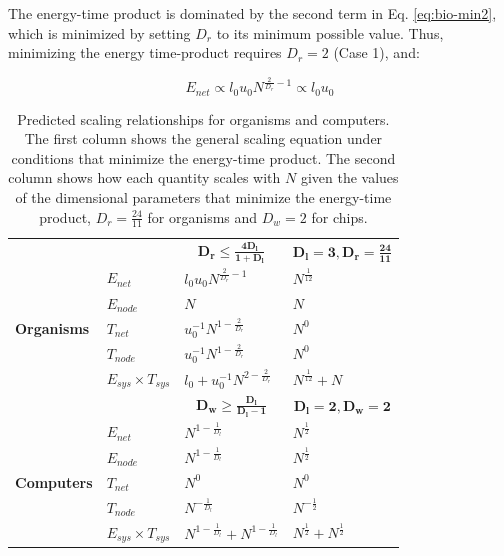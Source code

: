 \documentclass[12pt]{article}
\newcommand\T{\rule{0pt}{3ex}}       %
\newcommand\B{\rule[-1.2ex]{0pt}{0pt}} %
\begin{document}
The energy-time product is dominated by the second term in Eq.
\ref{eq:bio-min2}, which is minimized by setting $D_r$ to its minimum possible
value. Thus, minimizing the energy time-product requires $D_r = 2$
(Case 1), and:

\begin{equation}
E_{net} \propto l_0 u_0 N^{\frac{2}{D_r}-1} \propto l_0 u_0
\label{eq:EnetOrg}
\end{equation}


\begin{table}
\centering
\begin{tabular}{l|l||l|l|}
\multicolumn{2}{l}{} & \multicolumn{1}{c}{$\mathbf{D_r \leq
\frac{4D_l}{1+D_l}}$} & \multicolumn{1}{c}{$\mathbf{D_l=3, D_r=\frac{24}{11}}$}
  \T \B \\
  \cline{2-4}
\multirow{5}{*}{\textbf{Organisms}} & $E_{net}$ &$l_0u_0 N^{\frac{2}{D_r}-1}$ &
  $N^{\frac{1}{12}}$ \T \\
\cline{2-4}
& $E_{node}$ &  $N$ & $N$ \T \\
\cline{2-4}
& $T_{net}$ & $u_0^{-1}N^{1-\frac{2}{D_r}}$ & $N^0$ \T \\
\cline{2-4}
& $T_{node}$ & $u_0^{-1}N^{1-\frac{2}{D_r}}$ & $N^0$ \T \\  

\cline{2-4}
& $E_{sys} \times T_{sys}$ & $l_0 + u_0^{-1}N^{2-\frac{2}{D_r}}$ &
$N^{\frac{1}{12}} + N$ \T \\
\cline{2-4}
\multicolumn{2}{c}{}  & \multicolumn{1}{c}{$\mathbf{D_w \geq
\frac{D_l}{D_l-1}}$} & \multicolumn{1}{c}{$\mathbf{D_l=2,D_w =2}$} \T \B \\
\cline{2-4}
\multirow{5}{*}{\textbf{Computers}} & $E_{net}$ & $N^{1-\frac{1}{D_l}}$&
$N^{\frac{1}{2}}$ \T \\
\cline{2-4}
& $E_{node}$&$N^{1-\frac{1}{D_l}}$ &$N^{\frac{1}{2}}$ \T \\
\cline{2-4}
& $T_{net}$ & $N^{0}$& $N^{0}$ \T \\
\cline{2-4}
& $T_{node}$& $N^{-\frac{1}{D_l}}$& $N^{-\frac{1}{2}}$ \T \\
\cline{2-4}
& $E_{sys} \times T_{sys}$ &$N^{1-\frac{1}{D_l}} + N^{1-\frac{1}{D_l}}$
&$N^{\frac{1}{2}} + N^{\frac{1}{2}}$ \T \\
\cline{2-4}
\end{tabular}
\caption{Predicted scaling relationships for organisms and computers. The first column shows the general scaling equation under conditions that minimize the energy-time product. The second column shows how each quantity scales with $N$ given the values of the dimensional parameters that minimize the energy-time product, $D_r = \frac{24}{11}$ for organisms and $D_w = 2$ for chips. 
\label{tab:SummaryScalingPredictions}}
\end{table}
\end{document}
